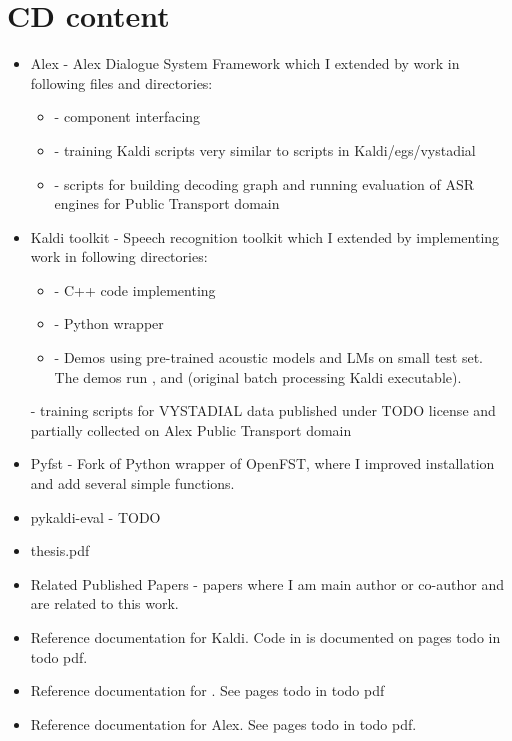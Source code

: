 \chapter{CD content}
\label{cha:cd_content}

\begin{itemize}
    \item Alex - Alex Dialogue System Framework which I extended by work in following files and directories:
        \begin{itemize}
            \item {} - component interfacing 
            \item {} - training Kaldi scripts very similar to scripts in Kaldi/egs/vystadial 
            \item {} - scripts for building decoding graph  and running evaluation of ASR engines for Public Transport domain 
        \end{itemize}
    \item Kaldi toolkit - Speech recognition toolkit which I extended by implementing work in following directories:
        \begin{itemize}
            \item {} - C++ code implementing 
            \item {} - Python wrapper 
            \item {} - Demos using pre-trained acoustic models and LMs on small test set. The demos run ,  and (original batch processing Kaldi executable).
        \end{itemize}  - training scripts for VYSTADIAL data published under TODO license and partially collected on Alex Public Transport domain 
    \item Pyfst - Fork of Python wrapper of OpenFST, where I improved installation and add several simple functions.
    \item pykaldi-eval - TODO
    \item thesis.pdf
    \item Related Published Papers - papers where I am main author or co-author and are related to this work.
    \item Reference documentation for Kaldi. Code in  is documented on pages todo in todo pdf.
    \item Reference documentation for . See pages todo in todo pdf 
    \item Reference documentation for Alex. See pages todo in todo pdf.
\end{itemize}

